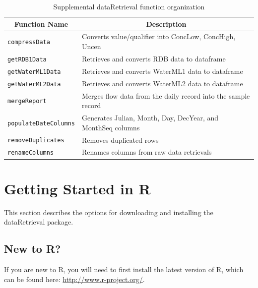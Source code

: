 \documentclass[a4paper,11pt]{article}\usepackage[]{graphicx}\usepackage[]{color}
\begin{document}
\begin{table}[!ht]
\begin{minipage}{\linewidth}
{\footnotesize
\caption{Supplemental dataRetrieval function organization} 
\label{tab:dataRetrievalMisc}
\begin{tabular}{ll}
  \hline
\multicolumn{1}{c}{\textbf{\textsf{Function Name}}} &
\multicolumn{1}{c}{\textbf{\textsf{Description}}} \\  [0pt]
  \hline
  \texttt{compressData} &  Converts value/qualifier into ConcLow, ConcHigh, Uncen\\
  [5pt]\texttt{getRDB1Data} & Retrieves and converts RDB data to dataframe\\
  [5pt]\texttt{getWaterML1Data} & Retrieves and converts WaterML1 data to dataframe\\
  [5pt]\texttt{getWaterML2Data} & Retrieves and converts WaterML2 data to dataframe\\
  [5pt]\texttt{mergeReport} & Merges flow data from the daily record into the sample record\\
  [5pt]\texttt{populateDateColumns} & Generates Julian, Month, Day, DecYear, and MonthSeq columns\\
  [5pt]\texttt{removeDuplicates} & Removes duplicated rows\\
  [5pt]\texttt{renameColumns} & Renames columns from raw data retrievals\\
   \hline
\end{tabular}
}
\end{minipage}
\end{table}

\FloatBarrier
\clearpage


\section{Getting Started in R}
\label{sec:appendix1}
This section describes the options for downloading and installing the dataRetrieval package.

\subsection{New to R?}
If you are new to R, you will need to first install the latest version of R, which can be found here: \url{http://www.r-project.org/}.
\end{document}
